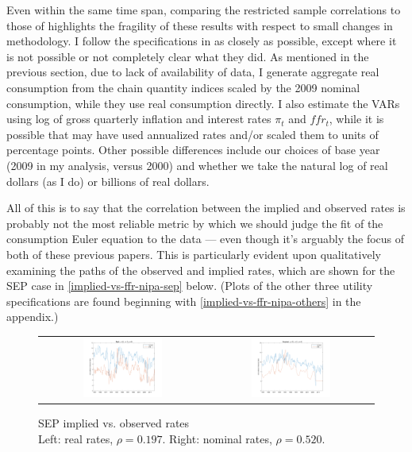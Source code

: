 Even within the same time span, comparing the restricted sample correlations to those of \cite{collard11} highlights the fragility of these results with respect to small changes in methodology. I follow the specifications in \cite{collard11} as closely as possible, except where it is not possible or not completely clear what they did. As mentioned in the previous section, due to lack of availability of data, I generate aggregate real consumption from the chain quantity indices scaled by the 2009 nominal consumption, while they use real consumption directly. I also estimate the VARs using log of gross quarterly inflation and interest rates $\pi_t$ and $ffr_t$, while it is possible that \cite{collard11} may have used annualized rates and/or scaled them to units of percentage points. Other possible differences include our choices of base year (2009 in my analysis, versus 2000) and whether we take the natural log of real dollars (as I do) or billions of real dollars.

All of this is to say that the correlation between the implied and observed rates is probably not the most reliable metric by which we should judge the fit of the consumption Euler equation to the data --- even though it's arguably the focus of both of these previous papers. This is particularly evident upon qualitatively examining the paths of the observed and implied rates, which are shown for the SEP case in \autoref{implied-vs-ffr-nipa-sep} below. (Plots of the other three utility specifications are found beginning with \autoref{implied-vs-ffr-nipa-others} in the appendix.)

\begin{figure}[h]
\centering
\captionsetup{singlelinecheck=false, justification=centering}
\caption{SEP implied vs. observed rates \\ Left: real rates, $\rho = 0.197$. Right: nominal rates, $\rho = 0.520$.}
\label{implied-vs-ffr-nipa-sep}
\begin{tabular}{cc}
\includegraphics[width=0.5\textwidth]{figs/nipa/real_sep} &
\includegraphics[width=0.5\textwidth]{figs/nipa/nominal_sep}
\end{tabular}
\end{figure}


